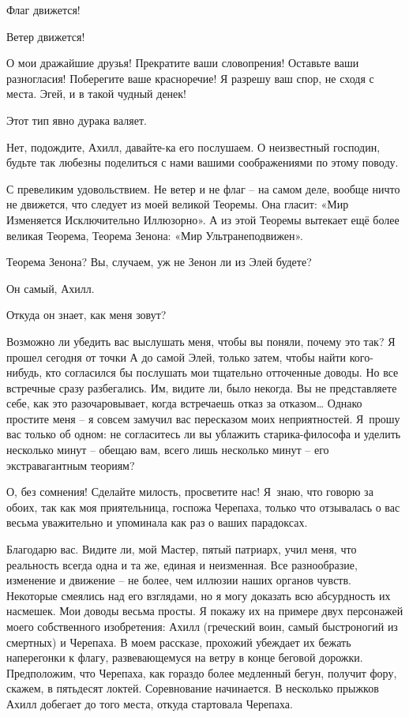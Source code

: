\documentclass[../main.tex]{subfiles}
\begin{document}
\begin{dialogue}
 Флаг движется!

 Ветер движется!

 О мои дражайшие друзья! Прекратите ваши словопрения! Оставьте ваши разногласия! Поберегите ваше красноречие! Я разрешу ваш спор, не сходя с места. Эгей, и в такой чудный денек!

 Этот тип явно дурака валяет.

 Нет, подождите, Ахилл, давайте-ка его послушаем. О неизвестный господин, будьте так любезны поделиться с нами вашими соображениями по этому поводу.

 С превеликим удовольствием. Не ветер и не флаг \--- на самом деле, вообще ничто не движется, что следует из моей великой Теоремы. Она гласит: «Мир Изменяется Исключительно Иллюзорно». А из этой Теоремы вытекает ещё более великая Теорема, Теорема Зенона: «Мир Ультранеподвижен».

 Теорема Зенона? Вы, случаем, уж не Зенон ли из Элей будете?

 Он самый, Ахилл.

 Откуда он знает, как меня зовут?

 Возможно ли убедить вас выслушать меня, чтобы вы поняли, почему это так? Я прошел сегодня от точки А до самой Элей, только затем, чтобы найти кого-нибудь, кто согласился бы послушать мои тщательно отточенные доводы. Но все встречные сразу разбегались. Им, видите ли, было некогда. Вы не представляете себе, как это разочаровывает, когда встречаешь отказ за отказом\ldots{} Однако простите меня \--- я совсем замучил вас пересказом моих неприятностей. Я~прошу вас только об одном: не согласитесь ли вы ублажить старика-философа и уделить несколько минут \--- обещаю вам, всего лишь несколько минут \--- его экстравагантным теориям?

 О, без сомнения! Сделайте милость, просветите нас! Я~знаю, что говорю за обоих, так как моя приятельница, госпожа Черепаха, только что отзывалась о вас весьма уважительно и упоминала как раз о ваших парадоксах.

 Благодарю вас. Видите ли, мой Мастер, пятый патриарх, учил меня, что реальность всегда одна и та же, единая и неизменная. Все разнообразие, изменение и движение \--- не более, чем иллюзии наших органов чувств. Некоторые смеялись над его взглядами, но я могу доказать всю абсурдность их насмешек. Мои доводы весьма просты. Я покажу их на примере двух персонажей моего собственного изобретения: Ахилл (греческий воин, самый быстроногий из смертных) и Черепаха. В моем рассказе, прохожий убеждает их бежать наперегонки к флагу, развевающемуся на ветру в конце беговой дорожки. Предположим, что Черепаха, как гораздо более медленный бегун, получит фору, скажем, в пятьдесят локтей. Соревнование начинается. В несколько прыжков Ахилл добегает до того места, откуда стартовала Черепаха.


\end{dialogue}
\end{document}
